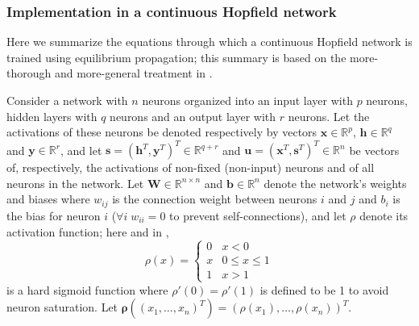 \documentclass[utf8]{frontiersSCNS}
\newcommand{\mtx}[1]{\mathbf{#1}}
\begin{document}
\vspace{1cm}\subsubsection{Implementation in a continuous Hopfield network}

Here we summarize the equations through which a continuous Hopfield network is trained using equilibrium propagation; this summary is based on the more-thorough and more-general treatment in \citep{scellier17}.

Consider a network with $n$ neurons organized into an input layer with $p$ neurons, hidden layers with $q$ neurons and an output layer with $r$ neurons. Let the activations of these neurons be denoted respectively by vectors $\mtx{x}\in\mathbb{R}^{p}$, $\mtx{h}\in\mathbb{R}^{q}$ and $\mtx{y}\in\mathbb{R}^{r}$, and let $\mtx{s}=(\mtx{h}^{T},\mtx{y}^{T})^{T}\in\mathbb{R}^{q+r}$ and $\mtx{u}=(\mtx{x}^{T}, \mtx{s}^{T})^{T}\in\mathbb{R}^{n}$ be vectors of, respectively, the activations of non-fixed (non-input) neurons and of all neurons in the network. Let $\mtx{W}\in\mathbb{R}^{n\times n}$ and $\mtx{b}\in\mathbb{R}^{n}$ denote the network's weights and biases where $w_{ij}$ is the connection weight between neurons $i$ and $j$ and $b_i$ is the bias for neuron $i$ ($\forall i \;w_{ii}=0$ to prevent self-connections), and let $\rho$ denote its activation function; here and in \citep{scellier17},
\begin{equation}
\rho(x)=\begin{cases}0&x<0\\x&0\leq x\leq 1\\1&x>1\end{cases} \label{eqn:hardened_sigmoid}
\end{equation}
 is a hard sigmoid function
where $\rho'(0)=\rho'(1)$ is defined to be 1 to avoid neuron saturation. Let $\mtx{\rho}((x_1,\hdots, x_n)^T)=(\rho(x_1),\hdots,\rho(x_n))^T$.
\end{document}
